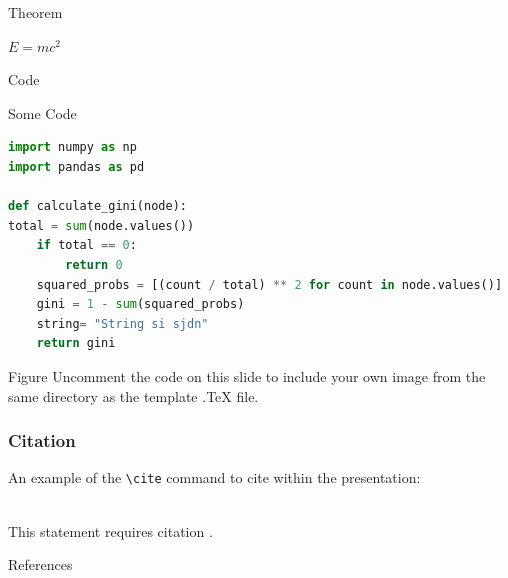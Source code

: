 \documentclass[aspectratio=169,xcolor=dvipsnames]{beamer}
\begin{document}
\begin{frame}{Theorem}
    \begin{theorem}
        $E = mc^2$
    \end{theorem}
\end{frame}



\begin{frame}[fragile]{Code}
\begin{block}{Some Code}
    \begin{lstlisting}[language=Python]
import numpy as np
import pandas as pd

def calculate_gini(node):
total = sum(node.values())
    if total == 0:
        return 0
    squared_probs = [(count / total) ** 2 for count in node.values()]
    gini = 1 - sum(squared_probs)
    string= "String si sjdn"
    return gini
    \end{lstlisting}
    \end{block}
\end{frame}


\begin{frame}{Figure}
    Uncomment the code on this slide to include your own image from the same directory as the template .TeX file.
\end{frame}


\begin{frame}[fragile] %
    \frametitle{Citation}
    An example of the \verb|\cite| command to cite within the presentation:\\~

    This statement requires citation \cite{p1}.
\end{frame}


\begin{frame}{References}
    \footnotesize
    
    
\end{frame}
\end{document}
